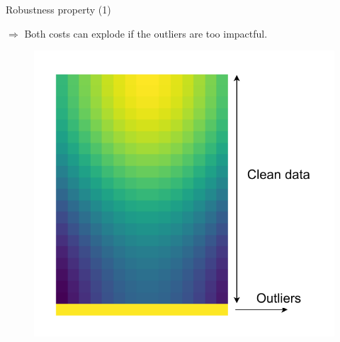 \documentclass{beamer}
\begin{document}
\begin{frame}{Robustness property (1)}
  \begin{minipage}[t]{0.7\linewidth}
    $\Rightarrow$ Both costs can explode if the outliers are too impactful.
  \end{minipage}%
    \hfill%
    \hspace{-6cm}
    \begin{minipage}[t]{0.3\linewidth}
      \vspace{-0.5cm}
    \begin{figure}
      \centering
      \includegraphics[width=1.25\linewidth, keepaspectratio=true]{OT_new/noisy_toy.pdf}
    \end{figure}
  \end{minipage}


\end{frame}
\end{document}
